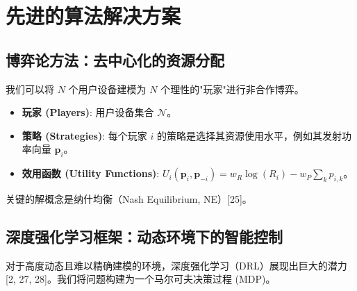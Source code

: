 \documentclass[11pt, a4paper]{article}
\begin{document}
\section{先进的算法解决方案}

\subsection{博弈论方法：去中心化的资源分配}

我们可以将 $N$ 个用户设备建模为 $N$ 个理性的"玩家"进行非合作博弈。

\begin{itemize}
\item \textbf{玩家 (Players)}: 用户设备集合 $\mathcal{N}$。
\item \textbf{策略 (Strategies)}: 每个玩家 $i$ 的策略是选择其资源使用水平，例如其发射功率向量 $\mathbf{p}_i$。
\item \textbf{效用函数 (Utility Functions)}: $U_i(\mathbf{p}_i, \mathbf{p}_{-i}) = w_{R} \log(R_i) - w_{P} \sum_k p_{i,k}$。
\end{itemize}

关键的解概念是纳什均衡（Nash Equilibrium, NE）[25]。

\subsection{深度强化学习框架：动态环境下的智能控制}

对于高度动态且难以精确建模的环境，深度强化学习（DRL）展现出巨大的潜力 [2, 27, 28]。我们将问题构建为一个马尔可夫决策过程 (MDP)。
\end{document}

